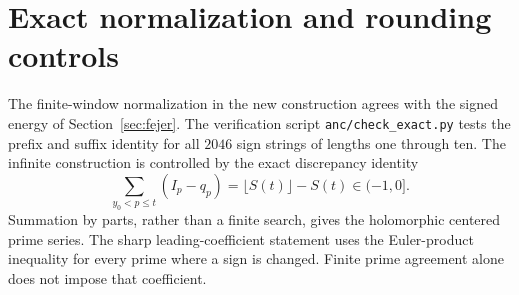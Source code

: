 \section{Exact normalization and rounding controls}\label{round26:app:rounding}
The finite-window normalization in the new construction agrees with the signed energy of Section~\ref{sec:fejer}. The verification script \texttt{anc/check\_exact.py} tests the prefix and suffix identity for all $2046$ sign strings of lengths one through ten. The infinite construction is controlled by the exact discrepancy identity
\[
 \sum_{y_0<p\le t}(I_p-q_p)=\lfloor S(t)\rfloor-S(t)\in(-1,0].
\]
Summation by parts, rather than a finite search, gives the holomorphic centered prime series. The sharp leading-coefficient statement uses the Euler-product inequality for every prime where a sign is changed. Finite prime agreement alone does not impose that coefficient.
